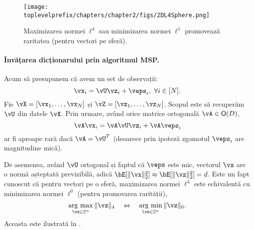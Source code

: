 \documentclass[../../book-main_ro.tex]{subfiles}
\begin{document}
\begin{figure}
    \centering
    \texttt{[image: \\toplevelprefix/chapters/chapter2/figs/2DL4Sphere.png]}\vspace{-0.1in}
    \caption{Maximizarea normei $\ell^4$ sau minimizarea normei $\ell^1$ promovează raritatea (pentru vectori pe sferă).}
    \label{fig:L4-sphere}
\end{figure}


\paragraph{Învățarea dicționarului prin algoritmul MSP.}

Acum să presupunem că avem un set de observații:
\begin{equation}
    \vx_i = \vU \vz_i + \veps_i,\ \forall i \in [N].
\end{equation}
Fie $\vX = [\vx_1, \dots, \vx_N]$ și $\vZ = [\vz_1, \dots, \vz_N]$. Scopul este să recuperăm $\vU$ din datele $\vX$. Prin urmare, având orice matrice ortogonală $\vA \in \O(D)$, 
\begin{equation}
    \vA\vx_i = \vA\vU \vz_i + \vA\veps_i
\end{equation}
ar fi aproape rară dacă $\vA = \vU^T$ (deoarece prin ipoteză zgomotul $\veps_i$ are magnitudine mică). 

De asemenea, având $\vU$ ortogonal și faptul că $\veps$ este mic, vectorul $\vx$ are o normă așteptată previzibilă, adică $\bE[\norm{\vx}_2^2] \approx \bE[\norm{\vz}_2^2]=d$. Este un fapt cunoscut că pentru vectori pe o sferă, maximizarea normei $\ell^4$ este echivalentă cu minimizarea normei $\ell^0$ (pentru promovarea rarității),
\begin{equation}
    \argmax_{\vz \in \mathbb{S}^n}\|\vz\|_{4}\quad\Leftrightarrow\quad \argmin_{\vz \in \mathbb{S}^n}\|\vz\|_{0}.
\end{equation}
Aceasta este ilustrată în .
\end{document}
